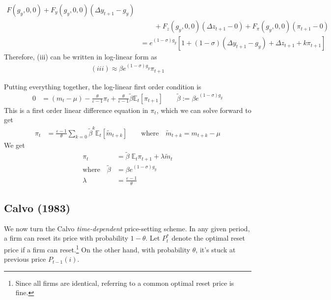 \documentclass[12pt]{article}
\theoremstyle{plain}
\theoremstyle{definition}
\theoremstyle{remark}
\newcommand{\E}{\mathbb{E}}
\begin{document}
\begin{enumerate}[label=(\roman*)]
\begin{align*}
          F(g_y,0,0)
          + F_y(g_y,0,0)(\Delta y_{t+1}-g_y)
          \\
          &\qquad
          + F_z(g_y,0,0)(\Delta z_{t+1}-0)
          + F_\pi(g_y,0,0)(\pi_{t+1}-0)
          \\
          &= e^{(1-\sigma)g_y}
          \left[
            1+(1-\sigma)(\Delta y_{t+1}-g_y)
            + \Delta z_{t+1}
            + k\pi_{t+1}
          \right]
        \end{align*}
        Therefore, (iii) can be written in log-linear form as
        \begin{align*}
          (iii) \approx
          \beta e^{(1-\sigma)g_y}\pi_{t+1}
        \end{align*}
    \end{enumerate}
    Putting everything together, the log-linear first order condition is
    \begin{align*}
      0 &=
      (m_t-\mu)
      - \frac{\theta}{\varepsilon-1} \pi_t
      + \frac{\theta}{\varepsilon-1}\tilde{\beta}\E_t[\pi_{t+1}]
      \qquad \tilde{\beta} := \beta e^{(1-\sigma)g_y}
    \end{align*}
    This is a first order linear difference equation in $\pi_t$, which
    we can solve forward to get
    \begin{align*}
       \pi_t
      &=
      \frac{\varepsilon-1}{\theta}
      \sum_{k=0} \tilde{\beta}^k
      \E_t[\tilde{m}_{t+k}]
      \qquad\text{where}\quad
      \tilde{m}_{t+k} = m_{t+k}-\mu
    \end{align*}
    We get
    \begin{align*}
      \pi_t &= \tilde{\beta}\;\E_t\pi_{t+1} + \lambda \tilde{m}_t
      \\
      \text{where}\quad
      \tilde{\beta} &=
        \beta e^{(1-\sigma)g_y} \\
      \lambda &=
        \frac{\varepsilon-1}{\theta}
    \end{align*}


\clearpage
\subsection{Calvo (1983)}

We now turn the Calvo \emph{time-dependent} price-setting scheme.
In any given period, a firm can reset its price with probability
$1-\theta$. Let $P_t^*$ denote the optimal reset price if a firm can
reset.\footnote{%
  Since all firms are identical, referring to a common optimal reset
  price is fine.
}
On the other hand, with probability $\theta$, it's stuck at previous
price $P_{t-1}(i)$.
\end{document}
